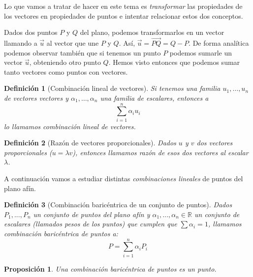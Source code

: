 \documentclass[11pt, a4paper, titlepage]{article}
\newcommand{\R}{\mathbb{R}}
\theoremstyle{theorem-style}
\newtheorem*{nprop}{Proposición}
\theoremstyle{definition-style}
\newtheorem*{ndef}{Definición}
\theoremstyle{remark-style}
\theoremstyle{example-style}
\begin{document}
\begin{figure*}[h]
\centering
{}
\caption{El punto (2,3) en el plano}
\end{figure*}

Lo que vamos a tratar de hacer en este tema es \textit{transformar} las propiedades de los vectores en propiedades de puntos e intentar relacionar estos dos conceptos.

Dados dos puntos $P$ y $Q$ del plano, podemos transformarlos en un vector llamando a $\vec{u}$ al vector que une $P$ y $Q$. Así, $\vec{u} = \overrightarrow{PQ} = Q-P$. De forma analítica podemos observar también que si tenemos un punto $P$ podemos sumarle un vector $\vec{u}$, obteniendo otro punto $Q$. Hemos visto entonces que podemos sumar tanto vectores como puntos con vectores.


\begin{ndef}[Combinación lineal de vectores]
	Si tenemos una familia $u_1,\ldots , u_n$ de vectores vectores y $\alpha_1,\ldots, \alpha_n$ una familia de escalares, entonces a
	\[
	\sum_{i=1}^n \alpha_i u_i
	\]
	lo llamamos \textit{combinación lineal de vectores}.
\end{ndef}

\begin{ndef}[Razón de vectores proporcionales]
	Dados $u$ y $v$ dos vectores proporcionales ($u = \lambda v$), entonces llamamos \textit{razón} de esos dos vectores al escalar $\lambda$.
\end{ndef}

A continuación vamos a estudiar distintas \textit{combinaciones lineales} de puntos del plano afín.

\begin{ndef}[Combinación baricéntrica de un conjunto de puntos]
	Dados $P_1,...,P_n$ un conjunto de puntos del plano afín y $\alpha_1,...,\alpha_n \in \R$ un conjunto de escalares (llamados \textit{pesos} de los puntos) que cumplen que $\sum \alpha_i = 1$, llamamos \textit{combinación baricéntrica de puntos} a:
	\[
	P = \sum_{i=1}^n \alpha_i P_i
	\]
\end{ndef}

\begin{nprop} Una combinación baricéntrica de puntos es un punto. 
\end{nprop}
\end{document}
